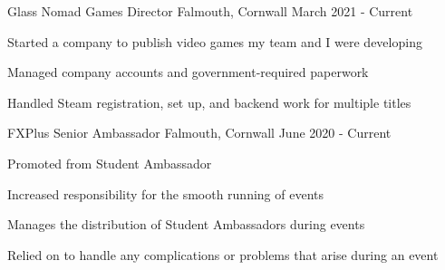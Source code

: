 

\begin{cventries}
    \cventry
        {Glass Nomad Games}
        {Director}
        {Falmouth, Cornwall}
        {March 2021 - Current}
        {
            \begin{cvitems}
                \item Started a company to publish video games my team and I were developing
                \item Managed company accounts and government-required paperwork
                \item Handled Steam registration, set up, and backend work for multiple titles
            \end{cvitems}
        }


    \cventry
        {FXPlus}
        {Senior Ambassador}
        {Falmouth, Cornwall}
        {June 2020 - Current}
        {
            \begin{cvitems}
                \item Promoted from Student Ambassador
                \item Increased responsibility for the smooth running of events
                \item Manages the distribution of Student Ambassadors during events
                \item Relied on to handle any complications or problems that arise during an event
            \end{cvitems}
        }


\end{cventries}

